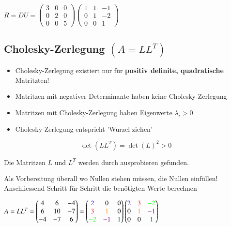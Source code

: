 \vspace{0.2cm}
		
$R = DU = 
	\begin{pmatrix} 
		3 & 0 & 0 \\ 0 & 2 & 0 \\ 0 & 0 & 5 
	\end{pmatrix} 
	\begin{pmatrix} 
		1 & 1 & -1 \\ 0 & 1 & -2 \\ 0 & 0 & 1 
	\end{pmatrix}$
		

\subsection[Cholesky-Zerlegung]{Cholesky-Zerlegung $(A = L L^T)$}

\begin{itemize}
	\item Cholesky-Zerlegung existiert nur für \textbf{positiv definite, quadratische} Matritzten! 
	\item Matritzen mit negativer Determinante haben keine Cholesky-Zerlegung
	\item Matritzen mit Cholesky-Zerlegung haben Eigenwerte $\lambda_i > 0$
	\item Cholesky-Zerlegung entspricht 'Wurzel ziehen'
\end{itemize}

$$ \det(L L^T) = \det(L)^2 > 0 $$ 
		


Die Matritzen $L$ und $L^T$ werden durch ausprobieren gefunden.

Als Vorbereitung überall wo Nullen stehen müssen, die Nullen einfüllen!\\
Anschliessend Schritt für Schritt die benötigten Werte berechnen

\vspace{0.2cm}

$A = L L^T = 
	\begin{pmatrix}
		4  & 6  & -4 \\
		6  & 10 & -7 \\
		-4 & -7 & 6 
	\end{pmatrix} 
= 
	\begin{pmatrix} 
		{\color{blue}2} 	& 0 		& 0 					\\
		{\color{red}3}		& {\color{orange}1} 	& 0 					\\
		{\color{green}-2} 	& {\color{violet}-1} 	& \textcolor{teal}{1}  
	\end{pmatrix} 
	\begin{pmatrix} 
		{\color{blue}2}	& {\color{red}3} 	& {\color{green}-2} 				\\
		0 		& {\color{orange}1} 	& {\color{violet}-1} 				\\
		0 		& 0 		& \textcolor{teal}{1} 
	\end{pmatrix} $
		
